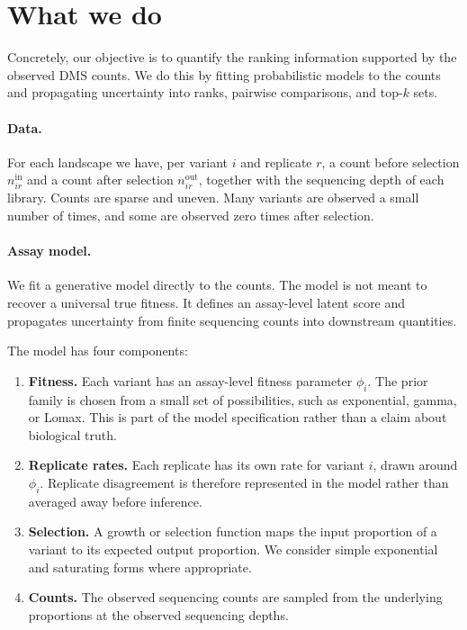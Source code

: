 \documentclass[11pt]{article}
\newcommand{\fit}{\phi}
\begin{document}
\section*{What we do}

Concretely, our objective is to quantify the ranking information supported by the observed DMS counts. We do this by fitting probabilistic models to the counts and propagating uncertainty into ranks, pairwise comparisons, and top-$k$ sets.

\paragraph{Data.}
For each landscape we have, per variant $i$ and replicate $r$, a count before selection $n^{\text{in}}_{ir}$ and a count after selection $n^{\text{out}}_{ir}$, together with the sequencing depth of each library. Counts are sparse and uneven. Many variants are observed a small number of times, and some are observed zero times after selection.

\paragraph{Assay model.}
We fit a generative model directly to the counts. The model is not meant to recover a universal true fitness. It defines an assay-level latent score and propagates uncertainty from finite sequencing counts into downstream quantities.

The model has four components:
\begin{enumerate}
  \item \textbf{Fitness.} Each variant has an assay-level fitness parameter $\fit_i$. The prior family is chosen from a small set of possibilities, such as exponential, gamma, or Lomax. This is part of the model specification rather than a claim about biological truth.
  \item \textbf{Replicate rates.} Each replicate has its own rate for variant $i$, drawn around $\fit_i$. Replicate disagreement is therefore represented in the model rather than averaged away before inference.
  \item \textbf{Selection.} A growth or selection function maps the input proportion of a variant to its expected output proportion. We consider simple exponential and saturating forms where appropriate.
  \item \textbf{Counts.} The observed sequencing counts are sampled from the underlying proportions at the observed sequencing depths.
\end{enumerate}
\end{document}
